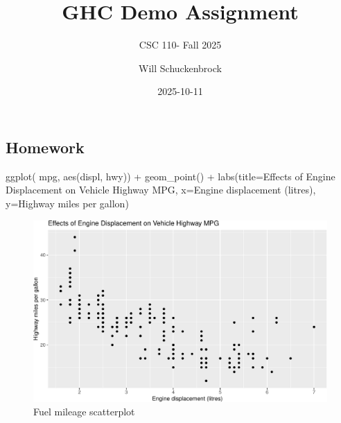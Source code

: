 \documentclass[
  letterpaper,
  DIV=11,
  numbers=noendperiod]{scrartcl}
\title{GHC Demo Assignment}
\subtitle{CSC 110- Fall 2025}
\author{Will Schuckenbrock}
\date{2025-10-11}
\newenvironment{Shaded}{\begin{snugshade}}{\end{snugshade}}
\newcommand{\AttributeTok}[1]{\textcolor[rgb]{0.40,0.45,0.13}{#1}}
\newcommand{\FunctionTok}[1]{\textcolor[rgb]{0.28,0.35,0.67}{#1}}
\newcommand{\NormalTok}[1]{\textcolor[rgb]{0.00,0.23,0.31}{#1}}
\newcommand{\SpecialCharTok}[1]{\textcolor[rgb]{0.37,0.37,0.37}{#1}}
\newcommand{\StringTok}[1]{\textcolor[rgb]{0.13,0.47,0.30}{#1}}
\renewcommand*\contentsname{Table of contents}
\newcommand\contentsname{Table of contents}
\begin{document}
\maketitle

\renewcommand*\contentsname{Table of contents}
{
\hypersetup{linkcolor=}
\setcounter{tocdepth}{1}
\tableofcontents
}

\subsection{Homework}\label{homework}

\begin{Shaded}
\begin{Highlighting}[]
\FunctionTok{ggplot}\NormalTok{(}
\NormalTok{  mpg, }\FunctionTok{aes}\NormalTok{(displ, hwy)) }\SpecialCharTok{+}
  \FunctionTok{geom\_point}\NormalTok{() }\SpecialCharTok{+}
  \FunctionTok{labs}\NormalTok{(}\AttributeTok{title=}\StringTok{\textquotesingle{}Effects of Engine Displacement on Vehicle Highway MPG\textquotesingle{}}\NormalTok{, }\AttributeTok{x=}\StringTok{\textquotesingle{}Engine displacement (litres)\textquotesingle{}}\NormalTok{, }\AttributeTok{y=}\StringTok{\textquotesingle{}Highway miles per gallon\textquotesingle{}}\NormalTok{)}
\end{Highlighting}
\end{Shaded}

\begin{figure}[H]

{\centering \includegraphics{ghc-demo_files/figure-pdf/unnamed-chunk-1-1.pdf}

}

\caption{Fuel mileage scatterplot}

\end{figure}%
\end{document}
